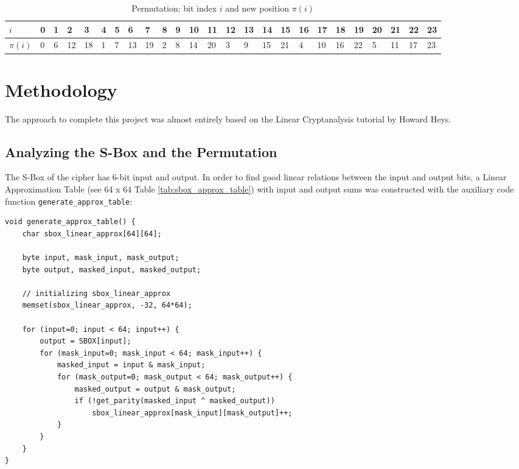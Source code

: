 \documentclass[11pt]{article}
\begin{document}
\begin{table}
\setlength{\tabcolsep}{3pt}
    \centering
    \begin{tabular}{|l|l|l|l|l|l|l|l|l|l|l|l|l|l|l|l|l|l|l|l|l|l|l|l|l|}
    \hline
$i$ & 0 & 1 &  2 &  3 & 4 & 5 &  6 &  7 & 8 & 9 & 10 & 11 & 12 & 13 & 14 & 15 & 16 & 17 & 18 & 19 & 20 & 21 & 22 & 23 \\ \hline
$\pi(i)$ & 0 & 6 & 12 & 18 & 1 & 7 & 13 & 19 & 2 & 8 & 14 & 20 &  3 &  9 & 15 & 21 &  4 & 10 & 16 & 22 &  5 & 11 & 17 & 23 \\ \hline
    \end{tabular}
    \caption{Permutation: bit index $i$ and new position $\pi(i)$}
    \label{tab:pbox}
\end{table}


\section{Methodology}

The approach to complete this project was almost entirely based on the Linear Cryptanalysis tutorial by Howard Heys. \cite{heys2002tutorial}

\subsection{Analyzing the S-Box and the Permutation}

The S-Box of the cipher has 6-bit input and output. In order to find good linear relations between the input and output bits, a Linear Approximation Table (see 64 x 64 Table \ref{tab:sbox_approx_table}) with input and output sums was constructed with the auxiliary code function \texttt{generate\_approx\_table}:

\begin{lstlisting}
void generate_approx_table() {
    char sbox_linear_approx[64][64];

    byte input, mask_input, mask_output;
    byte output, masked_input, masked_output;

    // initializing sbox_linear_approx
    memset(sbox_linear_approx, -32, 64*64);

    for (input=0; input < 64; input++) {
        output = SBOX[input];
        for (mask_input=0; mask_input < 64; mask_input++) {
            masked_input = input & mask_input;
            for (mask_output=0; mask_output < 64; mask_output++) {
                masked_output = output & mask_output;
                if (!get_parity(masked_input ^ masked_output))
                    sbox_linear_approx[mask_input][mask_output]++;
            }
        }
    }
}
\end{lstlisting}
\end{document}
